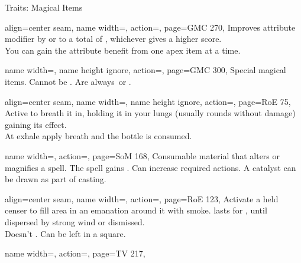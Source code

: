 \begin{PageBackLandscape}
\begin{TablesHalf}{\backTableHeight}
\begin{Table}{Traits: Magical Items}
\begin{entry}{}{%
                align=center seam,
                name width=\conditionLength,%
                action=\Apex,
                page=GMC 270,
            }
                Improves attribute modifier by  or to a total of , whichever gives a higher score. \hfill
                 \\
                You can gain the attribute benefit from one apex item at a time.
            \end{entry}
            \begin{entry}{}{%
                name width=\conditionLength,%
                name height ignore,
                action=\Artifact,
                page=GMC 300,
            }
                Special magical items. Cannot be . Are always \Rare\,or \Unique.
            \end{entry}
            \begin{entry}{}{%
                align=center seam,
                name width=\conditionLength,%
                name height ignore,
                action=\BottledBreath,
                page=RoE 75,
            }
                Active to breath it in, holding it in your lungs (usually \Constitution rounds without damage) gaining its effect.\\
                At exhale apply breath and the bottle is consumed.
            \end{entry}
            \begin{entry}{}{%
                name width=\conditionLength,%
                action=\Catalyst,
                page=SoM 168,
            }
                Consumable material that alters or magnifies a spell.
                The spell gains \Manipulate.
                Can increase required actions.
                A catalyst can be drawn as part of casting.
            \end{entry}
            \begin{entry}{}{%
                align=center seam,
                name width=\conditionLength,%
                action=\Censer,
                page=RoE 123,
            }
                Activate a held censer to fill area in an emanation around it with smoke.
                lasts for , until dispersed by strong wind or dismissed.\\
                Doesn't .
                Can be left in a square.
            \end{entry}
            \begin{entry}{}{%
                name width=\conditionLength,%
                action=\Coda,
                page=TV 217,
            }

\end{entry}
\end{Table}
\end{TablesHalf}
\end{PageBackLandscape}
